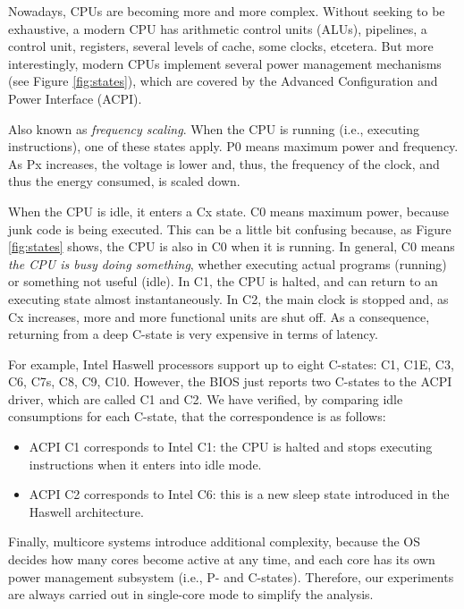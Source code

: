 \documentclass[twoside,nohyper]{tufte-book}
\providecommand{\tightlist}{%
  \setlength{\itemsep}{0pt}\setlength{\parskip}{0pt}}
\theoremstyle{definition}
\theoremstyle{definition}
\theoremstyle{definition}
\theoremstyle{remark}
\begin{document}
Nowadays, CPUs are becoming more and more complex. Without seeking to be
exhaustive, a modern CPU has arithmetic control units (ALUs), pipelines,
a control unit, registers, several levels of cache, some clocks,
etcetera. But more interestingly, modern CPUs implement several power
management mechanisms (see Figure \ref{fig:states}), which are covered
by the Advanced Configuration and Power Interface (ACPI).

\begin{description}
\tightlist
\item[P-states]
Also known as \emph{frequency scaling}. When the CPU is running (i.e.,
executing instructions), one of these states apply. P0 means maximum
power and frequency. As Px increases, the voltage is lower and, thus,
the frequency of the clock, and thus the energy consumed, is scaled
down.
\item[C-states]
When the CPU is idle, it enters a Cx state. C0 means maximum power,
because junk code is being executed. This can be a little bit confusing
because, as Figure \ref{fig:states} shows, the CPU is also in C0 when it
is running. In general, C0 means \emph{the CPU is busy doing something},
whether executing actual programs (running) or something not useful
(idle). In C1, the CPU is halted, and can return to an executing state
almost instantaneously. In C2, the main clock is stopped and, as Cx
increases, more and more functional units are shut off. As a
consequence, returning from a deep C-state is very expensive in terms of
latency.
\end{description}

For example, Intel Haswell processors support up to eight C-states: C1,
C1E, C3, C6, C7s, C8, C9, C10. However, the BIOS just reports two
C-states to the ACPI driver, which are called C1 and C2. We have
verified, by comparing idle consumptions for each C-state, that the
correspondence is as follows:

\begin{itemize}
\tightlist
\item
  ACPI C1 corresponds to Intel C1: the CPU is halted and stops executing
  instructions when it enters into idle mode.
\item
  ACPI C2 corresponds to Intel C6: this is a new sleep state introduced
  in the Haswell architecture.
\end{itemize}

Finally, multicore systems introduce additional complexity, because the
OS decides how many cores become active at any time, and each core has
its own power management subsystem (i.e., P- and C-states). Therefore,
our experiments are always carried out in single-core mode to simplify
the analysis.
\end{document}

